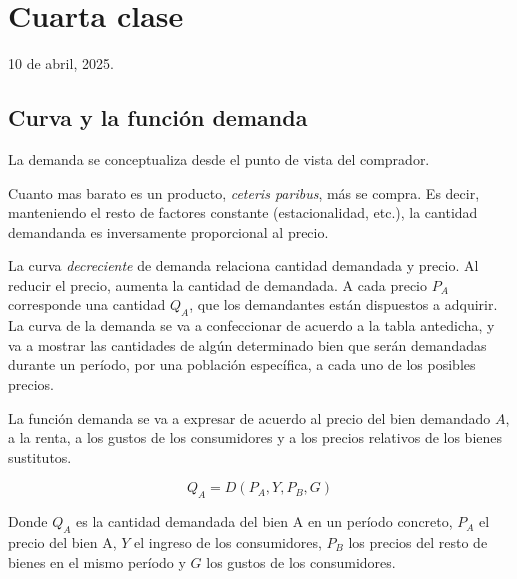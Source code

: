 \section{Cuarta clase}

10 de abril, 2025.

\subsection{Curva y la función demanda}

La demanda se conceptualiza desde el punto de vista del comprador.

Cuanto mas barato es un producto, \textit{ceteris paribus}, más se compra.
Es decir,
manteniendo el resto de factores constante (estacionalidad, etc.),
la cantidad demandanda es inversamente proporcional al precio.

La curva \textit{decreciente} de demanda relaciona cantidad demandada y precio.
Al reducir el precio,
aumenta la cantidad de demandada. 
A cada precio \(P_A\) corresponde una cantidad \(Q_A\),
que los demandantes están dispuestos a adquirir.
La curva de la demanda se va a confeccionar de acuerdo a la tabla antedicha,
y va a mostrar las cantidades de algún determinado bien que serán demandadas durante un período,
por una población específica, a cada uno de los posibles precios.

La función demanda se va a expresar de acuerdo al precio del bien demandado \(A\),
a la renta, a los gustos de los consumidores y a los precios relativos de los bienes sustitutos.

\begin{equation*}
    Q_A = D(P_A, Y, P_B, G)
\end{equation*}

Donde \(Q_A\) es la cantidad demandada del bien A en un período concreto,
\(P_A\) el precio del bien A,
\(Y\) el ingreso de los consumidores,
\(P_B\) los precios del resto de bienes en el mismo período
y \(G\) los gustos de los consumidores.

\begin{center}
\end{center}

